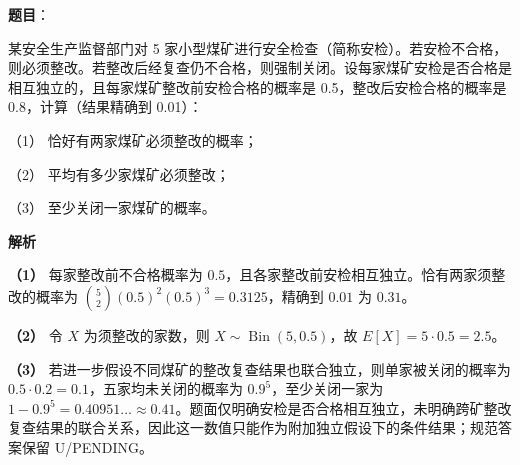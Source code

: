 \begin{answer}

\textbf{题目}：

某安全生产监督部门对 5 家小型煤矿进行安全检查（简称安检）。若安检不合格，则必须整改。若整改后经复查仍不合格，则强制关闭。设每家煤矿安检是否合格是相互独立的，且每家煤矿整改前安检合格的概率是 0.5，整改后安检合格的概率是 0.8，计算（结果精确到 0.01）：

（1） 恰好有两家煤矿必须整改的概率；

（2） 平均有多少家煤矿必须整改；

（3） 至少关闭一家煤矿的概率。

\textbf{解析}

\textbf{（1）} 每家整改前不合格概率为 $0.5$，且各家整改前安检相互独立。恰有两家须整改的概率为 $\binom52(0.5)^2(0.5)^3=0.3125$，精确到 $0.01$ 为 $0.31$。

\textbf{（2）} 令 $X$ 为须整改的家数，则 $X\sim\operatorname{Bin}(5,0.5)$，故 $E[X]=5\cdot0.5=2.5$。

\textbf{（3）} 若进一步假设不同煤矿的整改复查结果也联合独立，则单家被关闭的概率为 $0.5\cdot0.2=0.1$，五家均未关闭的概率为 $0.9^5$，至少关闭一家为 $1-0.9^5=0.40951\ldots\approx0.41$。题面仅明确安检是否合格相互独立，未明确跨矿整改复查结果的联合关系，因此这一数值只能作为附加独立假设下的条件结果；规范答案保留 U/PENDING。




\end{answer}
